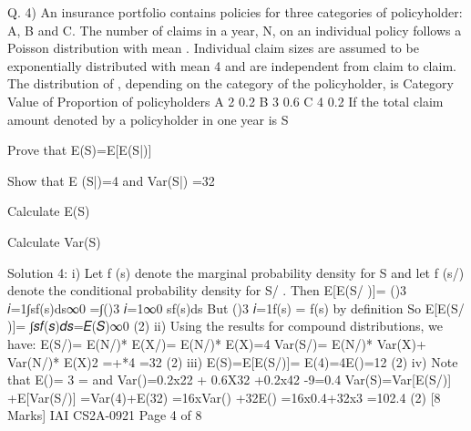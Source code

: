 Q. 4) An insurance portfolio contains policies for three categories of policyholder: A, B and C.
The number of claims in a year, N, on an individual policy follows a Poisson distribution
with mean \lambda. Individual claim sizes are assumed to be exponentially distributed with mean
4 and are independent from claim to claim. The distribution of \lambda, depending on the
category of the policyholder, is
Category Value of \lambda Proportion of policyholders
A 2 0.2
B 3 0.6
C 4 0.2
If the total claim amount denoted by a policyholder in one year is S
\item Prove that E(S)=E[E(S|\lambda)] 
\item Show that E (S|\lambda)=4 \lambda and Var(S|\lambda) =32 \lambda 
\item Calculate E(S) 
\item Calculate Var(S) 


Solution 4:
i)
Let f (s) denote the marginal probability density for S and let f (s/\lambda) denote the conditional probability density for S/ \lambda. Then
E[E(S/ \lambda)]= ()3
𝑖=1∫sf(s\lambda)ds∞0
=∫()3
𝑖=1∞0 sf(s\lambda)ds
But ()3
𝑖=1f(s\lambda) = f(s) by definition
So
E[E(S/ \lambda)]= ∫𝑠𝑓(𝑠)𝑑𝑠=𝐸(𝑆)∞0
(2)
ii)
Using the results for compound distributions, we have:
E(S/\lambda)= E(N/\lambda)* E(X/\lambda)= E(N/\lambda)* E(X)=4\lambda
Var(S/\lambda)= E(N/\lambda)* Var(X)+ Var(N/\lambda)* E(X)2
=+*4
=32\lambda
(2)
iii)
E(S)=E[E(S/\lambda)]= E(4\lambda)=4E(\lambda)=12
(2)
iv)
Note that E(\lambda)= 3 \lambda = and
Var(\lambda)=0.2x22 + 0.6X32 +0.2x42 -9=0.4
Var(S)=Var[E(S/\lambda)] +E[Var(S/\lambda)]
=Var(4\lambda)+E(32\lambda)
=16xVar(\lambda) +32E(\lambda)
=16x0.4+32x3
=102.4
(2)
[8 Marks]
IAI CS2A-0921
Page 4 of 8
